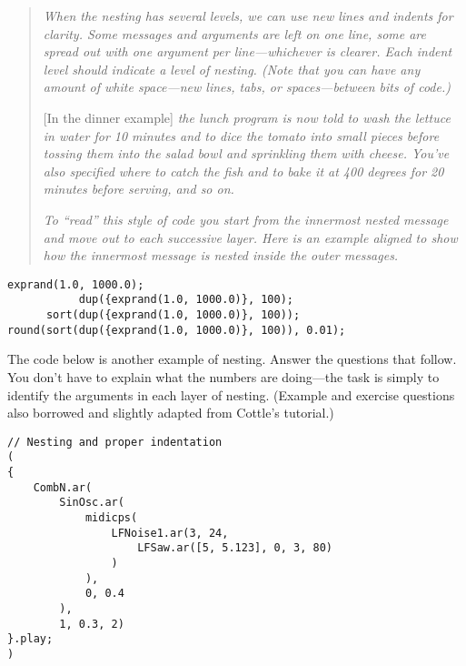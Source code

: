 \begin{quotation}
\textit{When the nesting has several levels, we can use new lines and indents for clarity. Some messages and arguments are left on one line, some are spread out with one argument per line---whichever is clearer. Each indent level should indicate a level of nesting. (Note that you can have any amount of white space---new lines, tabs, or spaces---between bits of code.)}

[In the dinner example]\textit{ the lunch program is now told to wash the lettuce in water for 10 minutes and to dice the tomato into small pieces before tossing them into the salad bowl and sprinkling them with cheese. You've also specified where to catch the fish and to bake it at 400 degrees for 20 minutes before serving, and so on.}

\textit{To ``read'' this style of code you start from the innermost nested message and move out to each successive layer. Here is an example aligned to show how the innermost message is nested inside the outer messages.}
\end{quotation}

%

\begin{lstlisting}[style=SuperCollider-IDE, basicstyle=\scttfamily\footnotesize]
                exprand(1.0, 1000.0);
           dup({exprand(1.0, 1000.0)}, 100);
      sort(dup({exprand(1.0, 1000.0)}, 100));
round(sort(dup({exprand(1.0, 1000.0)}, 100)), 0.01);
\end{lstlisting}

The code below is another example of nesting. Answer the questions that follow. You don't have to explain what the numbers are doing---the task is simply to identify the arguments in each layer of nesting. (Example and exercise questions also borrowed and slightly adapted from Cottle's tutorial.)

 
%

\begin{lstlisting}[style=SuperCollider-IDE, basicstyle=\scttfamily\footnotesize]
// Nesting and proper indentation
(
{
	CombN.ar(
		SinOsc.ar(
			midicps(
				LFNoise1.ar(3, 24,
					LFSaw.ar([5, 5.123], 0, 3, 80)
				)
			),
			0, 0.4
		),
		1, 0.3, 2)
}.play;
)
\end{lstlisting}

